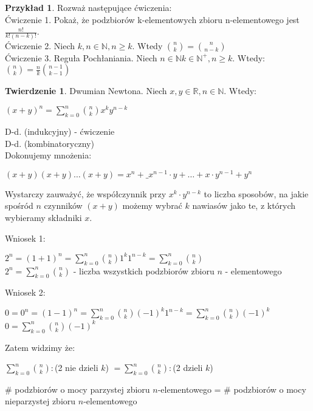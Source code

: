 \documentclass{article}
\theoremstyle{definition}
\theoremstyle{definition}
\newtheorem{tw}{Twierdzenie}[subsection]
\theoremstyle{definition}
\newtheorem{pk}{Przykład}[subsection]
\theoremstyle{definition}
\begin{document}
\begin{pk}
  Rozważ następujące ćwiczenia: \\
  Ćwiczenie 1. Pokaż, że podzbiorów k-elementowych zbioru n-elementowego jest $\frac{n!}{k!(n-k)!}$.\\
  Ćwiczenie 2. Niech $k,n \in \mathbb{N}, n\geq k$. Wtedy $\binom{n}{k}=\binom{n}{n-k}$\\
  Ćwiczenie 3. Reguła Pochłaniania. Niech $n\in\mathbb{N} k\in\mathbb{N}^{+}, n\geq k$. Wtedy: $\binom{n}{k} = \frac{n}{k} \binom{n-1}{k-1}$
\end{pk}

\begin{tw}
  Dwumian Newtona. Niech $x,y\in \mathbb{R}, n \in \mathbb{N}$. Wtedy:
  \begin{center}
    $(x+y)^n = \sum_{k=0}^{n} \binom{n}{k} x^k y^{n-k}$
  \end{center}
  D-d. (indukcyjny) - ćwiczenie\\
  D-d. (kombinatoryczny)\\
  Dokonujemy mnożenia:
  \begin{center}
    $(x+y)(x+y)\dots(x+y)=x^n + \_ x^{n-1}\cdot y + \dots + x\cdot y^{n-1} + y^n$
  \end{center}
  Wystarczy zauważyć, że współczynnik przy $x^k\cdot y^{n-k}$ to liczba sposobów, na jakie spośród 
  $n$ czynników $(x+y)$ możemy wybrać $k$ nawiasów jako te, z których wybieramy składniki $x$.
\end{tw}

Wniosek 1:\\
\begin{center}
  $2^n = (1+1)^n = \sum_{k=0}^{n} \binom{n}{k} 1^k 1^{n-k} = \sum_{k=0}^{n} \binom{n}{k}$\\
  $2^n = \sum_{k=0}^{n} \binom{n}{k}$ - liczba wszystkich podzbiorów zbioru $n$ - elementowego
\end{center}

Wniosek 2:\\
\begin{center}
  $0=0^n=(1-1)^n=\sum_{k=0}^{n} \binom{n}{k} (-1)^{k} 1^{n-k} = \sum_{k=0}^{n} \binom{n}{k} (-1)^{k}$\\
  $0=\sum_{k=0}^{n} \binom{n}{k} (-1)^k$
\end{center}

Zatem widzimy że:
\begin{center}
  $\sum_{k=0}^{n} \binom{n}{k} :$(2 nie dzieli $k$) $ = \sum_{k=0}^{n} \binom{n}{k} :$(2 dzieli $k$)
\end{center}
\# podzbiorów o mocy parzystej zbioru $n$-elementowego = \# podzbiorów o mocy nieparzystej zbioru $n$-elementowego
\end{document}
